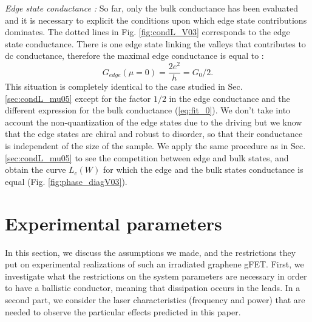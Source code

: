 \documentclass[aps,prb,showpacs,superscriptaddress,twocolumn,10pt,floatfix]{revtex4-1}
\begin{document}
\textit{Edge state conductance :} So far, only the bulk conductance has been evaluated and it is necessary to explicit the conditions upon which edge state contributions dominates. The dotted lines in Fig. \ref{fig:condL_V03} corresponds to the edge state conductance. There is one edge state linking the valleys that contributes to dc conductance\cite{Gu2011,Perez-Piskunow2015,Kitagawa2011,Foa2014}, therefore the maximal edge conductance is equal to :
\begin{equation}
G_{edge}(\mu=0)=\frac{2e^2}{h}=G_0/2.
\label{eq:edge_0}
\end{equation}
This situation is completely identical to the case studied in Sec. \ref{sec:condL_mu05} except for the factor $1/2$ in the edge conductance and the different expression for the bulk conductance (\ref{eq:fit_0}). We don't take into account the non-quantization of the edge states due to the driving\cite{Aaron2015} but we know that the edge states are chiral and robust to disorder, so that their conductance is independent of the size of the sample. We apply the same procedure as in Sec. \ref{sec:condL_mu05} to see the competition between edge and bulk states, and obtain the curve $L_c(W)$ for which the edge and the bulk states conductance is equal (Fig. \ref{fig:phase_diagV03}).





\section{Experimental parameters}

In this section, we discuss the assumptions we made, and the restrictions they put on experimental realizations of such an irradiated graphene gFET. First, we investigate what the restrictions on the system parameters are necessary in order to have a ballistic conductor, meaning that dissipation occurs in the leads. In a second part, we consider the laser characteristics (frequency and power) that are needed to observe the particular effects predicted in this paper.
\end{document}
